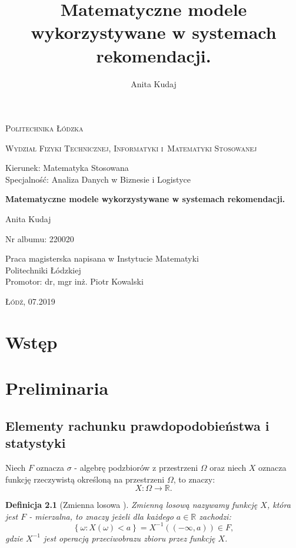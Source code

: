 \documentclass[12pt,a4paper]{report}
\author{Anita Kudaj}
\title{Matematyczne modele wykorzystywane w systemach rekomendacji.}
\newtheorem{df}{Definicja}[chapter]
\newcommand{\set}[1]{\left\lbrace {#1} \right\rbrace}
\newcommand{\setR}{\mathbb{R}}
\begin{document}
\begin{titlepage}
\begin{flushleft}
\end{flushleft}
\begin{center}
\textsc{{\huge Politechnika Łódzka}}
\end{center}
\bigskip
\bigskip
\begin{center}
\textsc{{\Large Wydział Fizyki Technicznej, Informatyki i~Matematyki Stosowanej}}
\end{center}
\bigskip
\bigskip
\begin{Large}
Kierunek: Matematyka Stosowana
\\Specjalność: Analiza Danych w Biznesie i Logistyce

\end{Large}
\bigskip
\bigskip
\noindent\hrulefill
\begin{center}
{\textbf{{\Large Matematyczne modele wykorzystywane w systemach rekomendacji.}}}
\end{center}
\begin{flushright}
{\large 
Anita Kudaj

Nr albumu: 
220020
}
\end{flushright}
\noindent\hrulefill
\bigskip
\bigskip
\begin{center}
{\large Praca magisterska
napisana w Instytucie Matematyki 
\\Politechniki Łódzkiej 
\bigskip
\bigskip
\\Promotor: dr, mgr inż. Piotr Kowalski
 }
\end{center}
\bigskip
\bigskip
\bigskip
\bigskip
\begin{center}
{\textsc{\large Łódź, 07.2019}}
\end{center}
\end{titlepage}


\tableofcontents


\chapter{Wstęp}
\chapter{Preliminaria} %
\section{Elementy rachunku prawdopodobieństwa i statystyki}
Niech $F$ oznacza $\sigma$ - algebrę podzbiorów z przestrzeni $\Omega$ oraz niech $X$ oznacza funkcję rzeczywistą określoną na przestrzeni $\Omega$, to znaczy: %
$$
X: \Omega \longrightarrow \setR.
$$
\begin{df}[Zmienna losowa {\citep[Sec 2.2 Def.2.2]{wztp}}]
Zmienną losową nazywamy funkcję $X$, która jest $F$ - mierzalna, to znaczy jeżeli dla każdego $a\in\setR$ zachodzi:
$$
\set{\omega : X(\omega) < a} = X^{-1}((-\infty,a))\in F,
$$ 
gdzie $X^{-1}$ jest operacją przeciwobrazu zbioru przez funkcję $X$.
\end{df}
\end{document}
